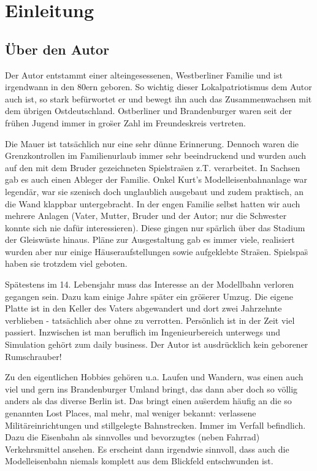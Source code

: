 \section{Einleitung}
\label{sec:introduction}

\subsection{\"Uber den Autor}
\label{sec:author}

Der Autor entstammt einer alteingesessenen, Westberliner Familie und ist irgendwann in den 80ern geboren.
So wichtig dieser Lokalpatriotismus dem Autor auch ist, so stark bef\"urwortet er und bewegt ihn auch das Zusammenwachsen mit dem \"ubrigen Ostdeutschland.
Ostberliner und Brandenburger waren seit der fr\"uhen Jugend immer in gro\"ser Zahl im Freundeskreis vertreten.

Die Mauer ist tats\"achlich nur eine sehr d\"unne Erinnerung.
Dennoch waren die Grenzkontrollen im Familienurlaub immer sehr beeindruckend und wurden auch auf den mit dem Bruder gezeichneten Spielstra\"sen z.T. verarbeitet.
In Sachsen gab es auch einen Ableger der Familie.
Onkel Kurt's Modelleisenbahnanlage war legend\"ar, war sie szenisch doch unglaublich ausgebaut und zudem praktisch, an die Wand klappbar untergebracht.
In der engen Familie selbst hatten wir auch mehrere Anlagen (Vater, Mutter, Bruder und der Autor; nur die Schwester konnte sich nie daf\"ur interessieren).
Diese gingen nur sp\"arlich \"uber das Stadium der Gleisw\"uste hinaus.
Pl\"ane zur Ausgestaltung gab es immer viele, realisiert wurden aber nur einige H\"auseraufstellungen sowie aufgeklebte Stra\"sen.
Spielspa\"s haben sie trotzdem viel geboten.

Sp\"atestens im 14. Lebensjahr muss das Interesse an der Modellbahn verloren gegangen sein.
Dazu kam einige Jahre sp\"ater ein gr\"o\"serer Umzug.
Die eigene Platte ist in den Keller des Vaters abgewandert und dort zwei Jahrzehnte verblieben - tats\"achlich aber ohne zu verrotten.
Pers\"onlich ist in der Zeit viel passiert.
Inzwischen ist man beruflich im Ingenieurbereich unterwegs und Simulation geh\"ort zum daily business.
Der Autor ist ausdr\"ucklich kein geborener Rumschrauber!

Zu den eigentlichen Hobbies geh\"oren u.a. Laufen und Wandern, was einen auch viel und gern ins Brandenburger Umland bringt, das dann aber doch so v\"ollig anders als das diverse Berlin ist.
Das bringt einen au\"serdem h\"aufig an die so genannten Lost Places, mal mehr, mal weniger bekannt:
verlassene Milit\"areinrichtungen und stillgelegte Bahnstrecken.
Immer im Verfall befindlich.
Dazu die Eisenbahn als sinnvolles und bevorzugtes (neben Fahrrad) Verkehrsmittel ansehen.
Es erscheint dann irgendwie sinnvoll, dass auch die Modelleisenbahn niemals komplett aus dem Blickfeld entschwunden ist.


